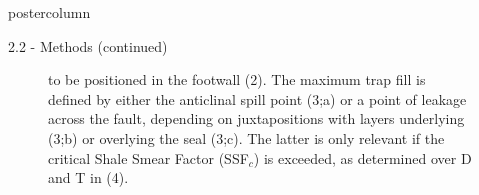 \documentclass{beamer}
\begin{document}
\begin{frame}
\begin{columns}
\begin{column}{.499\textwidth}
\begin{beamercolorbox}[center]{postercolumn}
\begin{minipage}{.98\textwidth}
{\begin{myblock}{2.2 - Methods (continued)}
\begin{minipage}{0.398\textwidth}
\begin{figure}
{									to be positioned in the	footwall (2). The maximum trap fill is defined by either the anticlinal spill point (3;a) or a point of leakage across the fault, depending on juxtapositions with layers
									underlying (3;b) or overlying the seal (3;c). The latter is only relevant if the
									critical Shale Smear Factor (SSF$_c$) is exceeded, as determined over D and T in (4).}
									\label{fig:trap_cond}
								\end{figure}
								\end{minipage}
								
\end{myblock}
								
}
\end{minipage}
\end{beamercolorbox}
\end{column}
\end{columns}
\end{frame}
\end{document}
